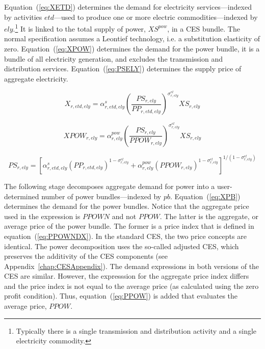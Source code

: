 \documentclass[11pt,letterpaper]{report}
\begin{document}
Equation~(\ref{eq:XETD}) determines the demand for electricity
services---indexed by activities $\mathit{etd}$---used to produce one or more
electric commodities---indexed by $\mathit{ely}$.\footnote{Typically there is a
single transmission and distribution activity and a single electricity
commodity.} It is linked to the total supply of power,
$\mathit{XS}^{\mathit{pow}}$, in a CES bundle. The normal specification assumes
a Leontief technology, i.e. a substitution elasticity of zero.
Equation~(\ref{eq:XPOW}) determines the demand for the power bundle, it is a
bundle of all electricity generation, and excludes the transmission and
distribution services. Equation~(\ref{eq:PSELY}) determines the supply price of
aggregate electricity.

\begin{equation}
\label{eq:XETD}
\mathit{X}_{r,\mathit{etd},\mathit{ely}} =
   \alpha^{\mathit{s}}_{r,\mathit{etd},\mathit{ely}}
   \left( \frac {\mathit{PS}_{r,\mathit{ely}}}
      {\mathit{PP}_{r,\mathit{etd}, \mathit{ely}}}
   \right)^{\sigma^{\mathit{el}}_{r,\mathit{ely}}}
   \mathit{XS}_{r,\mathit{ely}}
\end{equation}

\begin{equation}
\label{eq:XPOW}
\mathit{XPOW}_{r,\mathit{ely}} =
   \alpha^{\mathit{pow}}_{r,\mathit{ely}}
   \left( \frac {\mathit{PS}_{r,\mathit{ely}}} {\mathit{PPOW}_{r,\mathit{ely}}}
   \right)^{\sigma^{\mathit{el}}_{r,\mathit{ely}}}
   \mathit{XS}_{r,\mathit{ely}}
\end{equation}

\begin{equation}
\label{eq:PSELY}
\mathit{PS}_{r,\mathit{ely}} =
   \left[
      \alpha^{\mathit{s}}_{r,\mathit{etd},\mathit{ely}}
      \left( \mathit{PP}_{r,\mathit{etd}, \mathit{ely}}
      \right)^{1-\sigma^{\mathit{el}}_{r,\mathit{ely}}}
   +  \alpha^{\mathit{pow}}_{r,\mathit{ely}}
      \left( \mathit{PPOW}_{r,\mathit{ely}}
      \right)^{1-\sigma^{\mathit{el}}_{r,\mathit{ely}}}
   \right]^{1/(1-\sigma^{\mathit{el}}_{r,\mathit{ely}})}
\end{equation}

The following stage decomposes aggregate demand for power into a user-determined
number of power bundles---indexed by $\mathit{pb}$. Equation~(\ref{eq:XPB})
determines the demand for the power bundles. Notice that the aggregate price
used in the expression is $\mathit{PPOWN}$ and not $\mathit{PPOW}$. The latter
is the aggregate, or average price of the power bundle. The former is a price
index that is defined in equation~(\ref{eq:PPOWNDX}). In the standard CES, the
two price concepts are identical. The power decomposition uses the so-called
adjusted CES, which preserves the additivity of the CES components (see
Appendix~\ref{chap:CESAppendix}). The demand expressions in both versions of the
CES are similar. However, the expresssion for the aggregate price index differs
and the price index is not equal to the average price (as calculated using the
zero profit condition). Thus, equation~(\ref{eq:PPOW}) is added that evaluates
the average price, $\mathit{PPOW}$.
\end{document}
